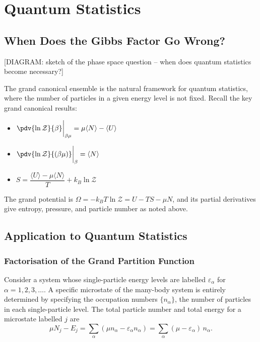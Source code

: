 \chapter{Quantum Statistics}

\section{When Does the Gibbs Factor Go Wrong?}

\begin{center}[DIAGRAM: sketch of the phase space question -- when does quantum statistics become necessary?]\end{center}

The grand canonical ensemble is the natural framework for quantum statistics, where the number of particles in a given energy level is not fixed. Recall the key grand canonical results:

\begin{itemize}
    \item $\displaystyle\pdv{\ln\mathcal{Z}}{\beta}\bigg|_{\beta\mu} = \mu\langle N\rangle - \langle U\rangle$
    \item $\displaystyle\pdv{\ln\mathcal{Z}}{(\beta\mu)}\bigg|_{\beta} = \langle N\rangle$
    \item $S = \dfrac{\langle U\rangle - \mu\langle N\rangle}{T} + k_B\ln\mathcal{Z}$
\end{itemize}

The grand potential is $\Omega = -k_BT\ln\mathcal{Z} = U - TS - \mu N$, and its partial derivatives give entropy, pressure, and particle number as noted above.

\section{Application to Quantum Statistics}

\subsection{Factorisation of the Grand Partition Function}

Consider a system whose single-particle energy levels are labelled $\varepsilon_\alpha$ for $\alpha = 1, 2, 3, \ldots$. A specific microstate of the many-body system is entirely determined by specifying the occupation numbers $\{n_\alpha\}$, the number of particles in each single-particle level. The total particle number and total energy for a microstate labelled $j$ are
\begin{equation}
    \mu N_j - E_j = \sum_\alpha (\mu n_\alpha - \varepsilon_\alpha n_\alpha) = \sum_\alpha (\mu - \varepsilon_\alpha)\,n_\alpha.
\end{equation}

